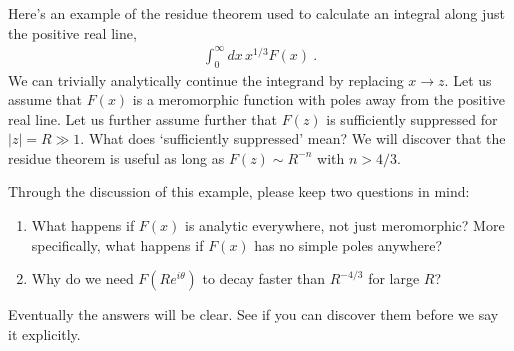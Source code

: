  Here's an example of the residue theorem used to calculate an integral along just the positive real line,
 \begin{align}
  \int_0^\infty dx\, x^{1/3} F(x) \ .
 \end{align}
 We can trivially analytically continue the integrand by replacing $x\to z$. Let us assume that $F(x)$ is a meromorphic function with poles away from the positive real line. Let us further assume further that $F(z)$ is sufficiently suppressed for $|z| = R \gg 1$. What does `sufficiently suppressed' mean? We will discover that the residue theorem is useful as long as $F(z) \sim R^{-n}$ with $n>4/3$. 

\begin{exercise}
Through the discussion of this example, please keep two questions in mind:
\begin{enumerate}
  \item What happens if $F(x)$ is analytic everywhere, not just meromorphic? More specifically, what happens if $F(x)$ has no simple poles anywhere?
  \item Why do we need $F\left(Re^{i\theta}\right)$ to decay faster than $R^{-4/3}$ for large $R$?
\end{enumerate}
Eventually the answers will be clear. See if you can discover them before we say it explicitly.
\end{exercise}
  
